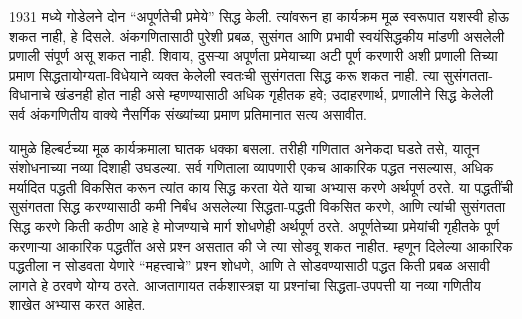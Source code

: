 \documentclass[../../../include/open-logic-section]{subfiles}
\begin{document}
1931 मध्ये गोडेलने दोन ``अपूर्णतेची प्रमेये'' सिद्ध केली. त्यांवरून
हा कार्यक्रम मूळ स्वरूपात यशस्वी होऊ शकत नाही, हे दिसले. अंकगणितासाठी
पुरेशी प्रबळ, सुसंगत आणि प्रभावी स्वयंसिद्धकीय मांडणी असलेली प्रणाली
संपूर्ण असू शकत नाही. शिवाय, दुसऱ्या अपूर्णता प्रमेयाच्या अटी पूर्ण करणारी
अशी प्रणाली तिच्या प्रमाण सिद्धतायोग्यता-विधेयाने व्यक्त केलेली स्वतःची
सुसंगतता सिद्ध करू शकत नाही. त्या सुसंगतता-विधानाचे खंडनही होत नाही असे
म्हणण्यासाठी अधिक गृहीतक हवे; उदाहरणार्थ, प्रणालीने सिद्ध केलेली सर्व
अंकगणितीय वाक्ये नैसर्गिक संख्यांच्या प्रमाण प्रतिमानात सत्य असावीत.

यामुळे हिल्बर्टच्या मूळ कार्यक्रमाला घातक धक्का बसला. तरीही गणितात
अनेकदा घडते तसे, यातून संशोधनाच्या नव्या दिशाही उघडल्या. सर्व गणिताला
व्यापणारी एकच आकारिक पद्धत नसल्यास, अधिक मर्यादित पद्धती विकसित करून
त्यांत काय सिद्ध करता येते याचा अभ्यास करणे अर्थपूर्ण ठरते. या पद्धतींची
सुसंगतता सिद्ध करण्यासाठी कमी निर्बंध असलेल्या सिद्धता-पद्धती विकसित
करणे, आणि त्यांची सुसंगतता सिद्ध करणे किती कठीण आहे हे मोजण्याचे मार्ग
शोधणेही अर्थपूर्ण ठरते. अपूर्णतेच्या प्रमेयांची गृहीतके पूर्ण करणाऱ्या
आकारिक पद्धतींत असे प्रश्न असतात की जे त्या सोडवू शकत नाहीत. म्हणून
दिलेल्या आकारिक पद्धतीला न सोडवता येणारे ``महत्त्वाचे'' प्रश्न शोधणे,
आणि ते सोडवण्यासाठी पद्धत किती प्रबळ असावी लागते हे ठरवणे योग्य ठरते.
आजतागायत तर्कशास्त्रज्ञ या प्रश्नांचा सिद्धता-उपपत्ती या नव्या
गणितीय शाखेत अभ्यास करत आहेत.
\end{document}

